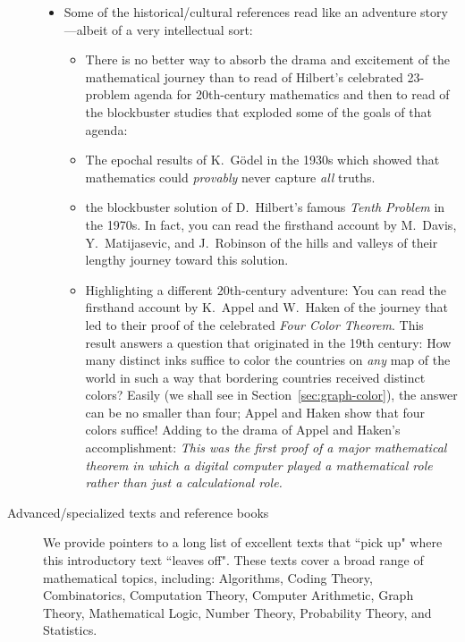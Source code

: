 \begin{description}
\begin{itemize}
\item
Some of the historical/cultural references read like an adventure story---albeit of a very intellectual sort:
   \begin{itemize}
   \item
There is no better way to absorb the drama and excitement of the mathematical journey than to read of Hilbert's celebrated 23-problem agenda for 20th-century mathematics and then to read of the blockbuster studies that exploded some of the goals of that agenda:

   \item
The epochal results of K.~G\"{o}del in the 1930s which showed that mathematics could {\em provably} never capture {\em all} truths.

   \item
the blockbuster solution of D.~Hilbert's famous {\em Tenth Problem} in the 1970s.  In fact, you can  read the firsthand account by M.~Davis, Y.~Matijasevic, and J.~Robinson of the hills and valleys of their lengthy journey toward this solution.

  \item
Highlighting a different 20th-century adventure:  You can read the firsthand account by K.~Appel and W.~Haken of the journey that led to their proof of the celebrated {\em Four Color Theorem}.  This result answers a question that originated in the 19th century: How many distinct inks suffice to color the countries on {\em any} map of the world in such a way that bordering countries received distinct colors?  Easily (we shall see in Section~\ref{sec:graph-color}), the answer can be no smaller than four; Appel and Haken show that four colors suffice!  Adding to the drama of Appel and Haken's accomplishment:  {\em This was the first proof of a major mathematical theorem in which a digital computer played a {\em mathematical} role rather than just a {\em calculational} role.}
   \end{itemize}
\end{itemize}

\item[{\sc Advanced/specialized texts and reference books}]
We provide pointers to a long list of excellent texts that ``pick up" where this introductory text ``leaves off".  These texts cover a broad range of mathematical topics, including: Algorithms, Coding Theory, Combinatorics, Computation Theory, Computer Arithmetic, Graph Theory, Mathematical Logic, Number Theory, Probability Theory, and Statistics.
\end{description}



